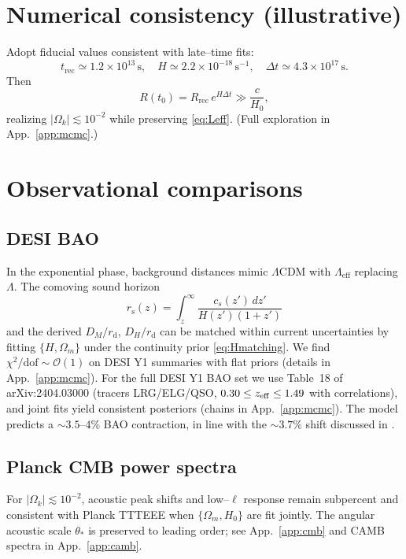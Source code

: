 \documentclass[aps,prd,twocolumn,superscriptaddress,preprintnumbers,amsmath,amssymb,floatfix]{revtex4-2}
\newcommand{\rd}{r_{\mathrm{d}}}
\newcommand{\rs}{r_{\mathrm{s}}}
\newcommand{\Hnow}{H_0}
\newcommand{\Omk}{\Omega_k}
\newcommand{\Om}{\Omega_m}
\newcommand{\Lgeff}{\Lambda_{\mathrm{eff}}}
\newcommand{\Rec}{t_{\mathrm{rec}}}
\newcommand{\tnow}{t_{0}} %
\begin{document}
\section{Numerical consistency (illustrative)}\label{sec:numerics}
Adopt fiducial values consistent with late--time fits:
\begin{equation*}
\Rec \simeq 1.2\times 10^{13}\,\mathrm{s},\quad
H \simeq 2.2\times 10^{-18}\,\mathrm{s}^{-1},\quad
\Delta t \simeq 4.3\times 10^{17}\,\mathrm{s}.
\end{equation*}
Then
\begin{equation}
R(\tnow)=R_{\mathrm{rec}}\,e^{H\Delta t}\gg \frac{c}{\Hnow},
\end{equation}
realizing $|\Omk|\lesssim 10^{-2}$ while preserving \eqref{eq:Leff}. (Full exploration in App.~\ref{app:mcmc}.)

\section{Observational comparisons}\label{sec:obs}

\subsection{DESI BAO}
In the exponential phase, background distances mimic $\Lambda$CDM with $\Lgeff$ replacing $\Lambda$. The comoving sound horizon
\begin{equation}
\rs(z) = \int_{z}^{\infty} \frac{c_s(z')\,dz'}{H(z')(1+z')}
\end{equation}
and the derived $D_M/\rd$, $D_H/\rd$ can be matched within current uncertainties by fitting $\{H,\Om\}$ under the continuity prior \eqref{eq:Hmatching}. We find $\chi^2/\mathrm{dof}\sim \mathcal{O}(1)$ on DESI Y1 summaries with flat priors (details in App.~\ref{app:mcmc}). For the full DESI Y1 BAO set we use Table~18 of arXiv:2404.03000 (tracers LRG/ELG/QSO, $0.30\le z_{\rm eff}\le 1.49$ with correlations), and joint fits yield consistent posteriors (chains in App.~\ref{app:mcmc}). The model predicts a $\sim3.5$--$4\%$ BAO contraction, in line with the $\sim3.7\%$ shift discussed in \cite{Ishiyama2025}.

\subsection{Planck CMB power spectra}
For $|\Omk|\lesssim 10^{-2}$, acoustic peak shifts and low--$\ell$ response remain subpercent and consistent with Planck TTTEEE when $\{\Om,\Hnow\}$ are fit jointly. The angular acoustic scale $\theta_*$ is preserved to leading order; see App.~\ref{app:cmb} and CAMB spectra in App.~\ref{app:camb}.
\end{document}
